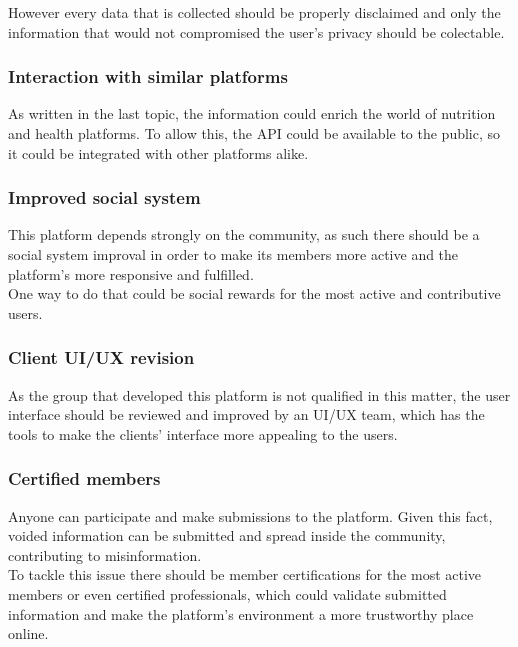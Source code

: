 However every data that is collected should be properly disclaimed and only the information that
would not compromised the user's privacy should be colectable.

\subsubsection{Interaction with similar platforms}

As written in the last topic, the information could enrich the world of nutrition and health platforms.
To allow this, the API could be available to the public, so it could be integrated with other platforms
alike.\\

\subsubsection{Improved social system}

This platform depends strongly on the community, as such there should be a social system improval in order
to make its members more active and the platform's more responsive and fulfilled.\\

One way to do that could be social rewards for the most active and contributive users.

\subsubsection{Client UI/UX revision}

As the group that developed this platform is not qualified in this matter, 
the user interface should be reviewed and improved by an UI/UX team, which has the tools to make the clients' 
interface more appealing to the users.

\subsubsection{Certified members}

Anyone can participate and make submissions to the platform. Given this fact, voided information
can be submitted and spread inside the community, contributing to misinformation.\\

To tackle this issue there should be member certifications for the most active members or even
certified professionals, which could validate submitted information and make the platform's
environment a more trustworthy place online. 

